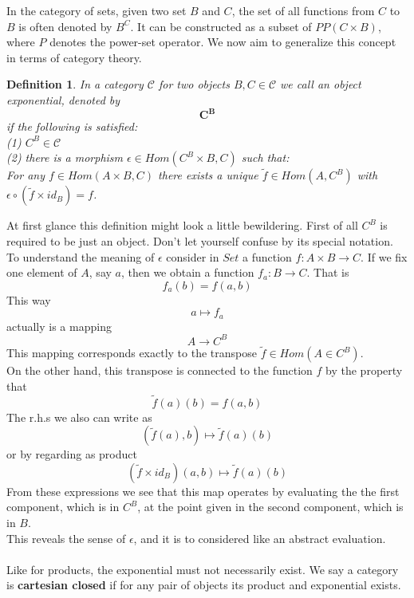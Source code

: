 \documentclass[17pt]{extarticle}
\newtheorem*{definition*}{Definition}
\begin{document}
In the category of sets, given two set $B$ and $C$, the set of all functions from $C$ to $B$ is often denoted by $B^C$. It can be constructed as a subset of $PP(C\times B)$, where $P$ denotes the power-set operator. We now aim to generalize this concept in terms of category theory.\\

\begin{definition*}
In a category $\mathcal{C}$ for two objects $B, C\in\mathcal{C}$ we call an object exponential, denoted by
	$$\mathbf{C^B}$$
	if the following is satisfied:\\
	(1) $C^B\in\mathcal{C}$\\
	(2) there is a morphism $\epsilon\in Hom(C^B\times B, C)$ such that:\\
	For any $f\in Hom(A\times B, C)$ there exists a unique $\tilde{f}\in Hom(A, C^B)$ with $\epsilon\circ(\tilde{f}\times id_B)=f$.
\end{definition*}
\leavevmode\newline
At first glance this definition might look a little bewildering. First of all $C^B$ is required to be just an object. Don't let yourself confuse by its special notation. To understand the meaning of $\epsilon$ consider in $Set$ a function $f:A\times B\rightarrow C$. If we fix one element of $A$, say $a$, then we obtain a function $f_a:B\rightarrow C$. That is
$$f_a(b)=f(a,b)$$
This way 
$$a\mapsto f_a$$
actually is a mapping 
$$A\rightarrow C^B$$
This mapping corresponds exactly to the transpose $\tilde{f}\in Hom(A\in C^B)$.\\
On the other hand, this transpose is connected to the function $f$ by the property that 
$$\tilde{f}(a)(b)=f(a,b)$$
The r.h.s we also can write as
$$\left(\tilde{f}(a),b\right)\mapsto \tilde{f}(a)(b)$$
or by regarding as product
$$(\tilde{f}\times id_B)(a,b)\mapsto \tilde{f}(a)(b)$$
From these expressions we see that this map operates by evaluating the the first component,
which is in $C^B$, at the point given in the second component, which is in $B$.\\
This reveals the sense of $\epsilon$, and it is to considered like an abstract evaluation.\\ \\
Like for products, the exponential must not necessarily exist. We say a category is \textbf{cartesian closed} if for any pair of objects its product and exponential exists.
\end{document}
